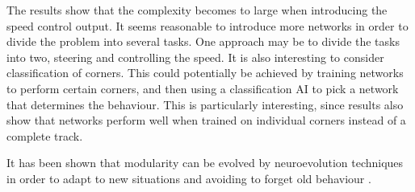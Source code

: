 The results show that the complexity becomes to large when introducing the speed control output. It seems reasonable to introduce more networks in order to divide the problem into several tasks. One approach may be to divide the tasks into two, steering and controlling the speed. It is also interesting to consider classification of corners. This could potentially be achieved by training networks to perform certain corners, and then using a classification AI to pick a network that determines the behaviour. This is particularly interesting, since results also show that networks perform well when trained on individual corners instead of a complete track.


It has been shown that modularity can be evolved by neuroevolution techniques in order to adapt to new situations and avoiding to forget old behaviour \cite{ellefs2015neural}.









